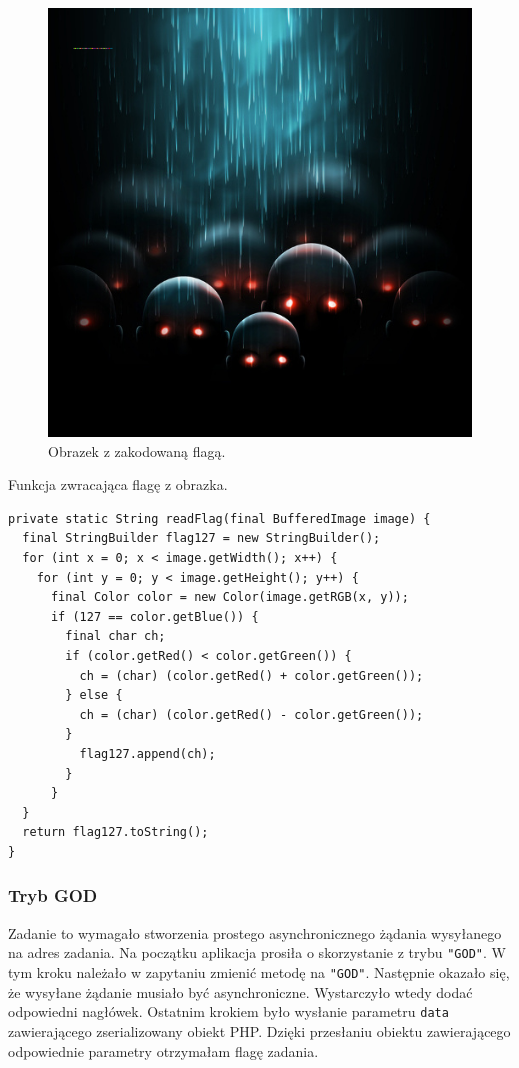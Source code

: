\documentclass[12pt,a4paper,titlepage]{article}
\begin{document}
\begin{figure}[H]
  \includegraphics[width=\linewidth]{stegano.png}
  \caption{Obrazek z zakodowaną flagą.}
  \label{fig:punkty}
\end{figure}

\begin{listing}[H]
\caption{Funkcja zwracająca flagę z obrazka.}
\begin{verbatim}
private static String readFlag(final BufferedImage image) {
  final StringBuilder flag127 = new StringBuilder();
  for (int x = 0; x < image.getWidth(); x++) {
    for (int y = 0; y < image.getHeight(); y++) {
      final Color color = new Color(image.getRGB(x, y));
      if (127 == color.getBlue()) {
        final char ch;
        if (color.getRed() < color.getGreen()) {
          ch = (char) (color.getRed() + color.getGreen());
        } else {
          ch = (char) (color.getRed() - color.getGreen());
        }
          flag127.append(ch);
        }
      }
  }
  return flag127.toString();
}
\end{verbatim}
\end{listing}

\subsubsection{Tryb GOD}
Zadanie to wymagało stworzenia prostego asynchronicznego żądania wysyłanego na adres zadania. Na początku aplikacja prosiła o skorzystanie z trybu \texttt{"GOD"}. W tym kroku należało w zapytaniu zmienić metodę na \texttt{"GOD"}. Następnie okazało się, że wysyłane żądanie musiało być asynchroniczne. Wystarczyło wtedy dodać odpowiedni nagłówek. Ostatnim krokiem było wysłanie parametru \texttt{data} zawierającego zserializowany obiekt PHP. Dzięki przesłaniu obiektu zawierającego odpowiednie parametry otrzymałam flagę zadania.
\end{document}

